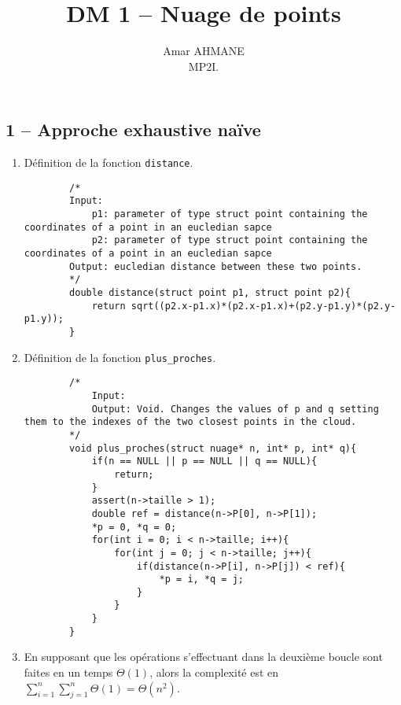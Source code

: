 \documentclass[10pt]{article}
\title{DM 1 – Nuage de points}
\author{Amar AHMANE\\ MP2I.}
\date{}
\newcommand{\f}[1]{\texttt{#1}}
\begin{document}
	\maketitle
	\subsection*{1 – Approche exhaustive naïve}
	\begin{enumerate}[start=1,label={\bfseries Question \arabic*}]
		\item Définition de la fonction \f{distance}.
		\begin{lstlisting}
		/*
		Input: 
			p1: parameter of type struct point containing the coordinates of a point in an eucledian sapce
			p2: parameter of type struct point containing the coordinates of a point in an eucledian sapce
		Output: eucledian distance between these two points.
		*/
		double distance(struct point p1, struct point p2){
			return sqrt((p2.x-p1.x)*(p2.x-p1.x)+(p2.y-p1.y)*(p2.y-p1.y));
		}
		\end{lstlisting}
		\item Définition de la fonction \f{plus\_proches}.
		\begin{lstlisting}
		/*
			Input:
			Output: Void. Changes the values of p and q setting them to the indexes of the two closest points in the cloud.
		*/
		void plus_proches(struct nuage* n, int* p, int* q){
			if(n == NULL || p == NULL || q == NULL){
				return;
			}
			assert(n->taille > 1);
			double ref = distance(n->P[0], n->P[1]);
			*p = 0, *q = 0;
			for(int i = 0; i < n->taille; i++){
				for(int j = 0; j < n->taille; j++){
					if(distance(n->P[i], n->P[j]) < ref){
						*p = i, *q = j;
					}
				}
			}
		}
		\end{lstlisting}
		\item En supposant que les opérations s'effectuant dans la deuxième boucle sont faites en un temps $\Theta(1)$, alors la complexité est en $\sum_{i=1}^n\sum_{j=1}^n\Theta(1)=\Theta(n^2)$.
	\end{enumerate}
\end{document}
